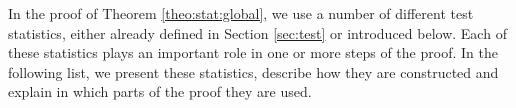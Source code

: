 \documentclass[a4paper,12pt]{article}
\newcommand{\doublehattwo}[1]{\widehat{\widehat{#1}}}
\begin{document}
In the proof of Theorem \ref{theo:stat:global}, we use a number of different test statistics, either already defined in Section \ref{sec:test} or introduced below. Each of these statistics plays an important role in one or more steps of the proof. In the following list, we present these statistics, describe how they are constructed and explain in which parts of the proof they are used. %
\end{document}
